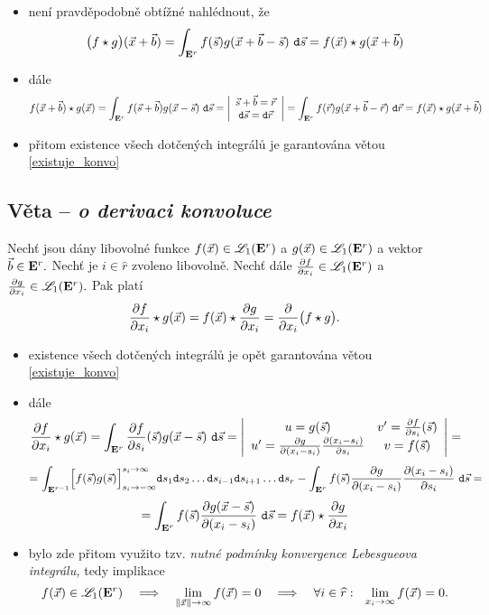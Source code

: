 \Proof

\begin{itemize}
\item nen\'i pravd\v epodobn\v e obt\'i\v zn\'e nahl\'ednout, \v ze
%
$$ \bigl(f \star g\bigr) ({\vec{x}}+{\vec{b}}) = \int_{{{\mathbf E}^r}} f({\vec{s}})g({\vec{x}}+{\vec{b}}-{\vec{s}})~\mathtt{d}{\vec{s}} = f({\vec{x}}) \star g({\vec{x}}+{\vec{b}}) $$
\item d\'ale
%
$$ f({\vec{x}}+{\vec{b}}) \star g({\vec{x}}) = \int_{{{\mathbf E}^r}} f({\vec{s}}+{\vec{b}})g({\vec{x}}-{\vec{s}})~\mathtt{d}{\vec{s}} = \left|\begin{array}{c} {\vec{s}}+{\vec{b}}={\vec{r}}\\ \mathtt{d}{\vec{s}}=\mathtt{d}{\vec{r}} \end{array}\right| = \int_{{{\mathbf E}^r}} f({\vec{r}})g({\vec{x}}+{\vec{b}}-{\vec{r}})~\mathtt{d}{\vec{r}}= f({\vec{x}}) \star g({\vec{x}}+{\vec{b}})$$
\item p\v ritom existence v\v sech dot\v cen\'ych integr\'al\r u je garantov\'ana v\v etou \ref{existuje_konvo}


\end{itemize}

\subsection{Věta -- \emph{o derivaci konvoluce}}

Nech\v t jsou d\'any libovoln\'e funkce $f({\vec{x}})\in{\mathscr L}_1({{\mathbf E}^r})$ a $g({\vec{x}})\in{\mathscr L}_1({{\mathbf E}^r})$ a vektor ${\vec{b}}\in{{\mathbf E}^r}.$ Nech\v t je $i\in \widehat{r}$ zvoleno libovoln\v e. Nech\v t d\'ale  $\frac{\partial f}{\partial x_i} \in{\mathscr L}_1({{\mathbf E}^r})$ a $\frac{\partial g}{\partial x_i}\in{\mathscr L}_1({{\mathbf E}^r}).$ Pak plat\'i
%
$$ \frac{\partial f}{\partial x_i} \star g({\vec{x}}) = f({\vec{x}}) \star \frac{\partial g}{\partial x_i} = \frac{\partial }{\partial x_i}\bigl(f \star g\bigr). $$

\Proof

\begin{itemize}
\item existence v\v sech dot\v cen\'ych integr\'al\r u je op\v et garantov\'ana v\v etou \ref{existuje_konvo}
\item d\'ale
%
$$ \frac{\partial f}{\partial x_i} \star g({\vec{x}}) = \int_{{{\mathbf E}^r}} \frac{\partial f}{\partial s_i}({\vec{s}}) g({\vec{x}}-{\vec{s}})~\mathtt{d}{\vec{s}} =  \left|\begin{array}{cc} u=g({\vec{s}}) & v'=\frac{\partial f}{\partial s_i}({\vec{s}}) \\ u'=\frac{\partial g}{\partial(x_i-s_i)}\frac{\partial(x_i-s_i)}{\partial s_i} & v=f({\vec{s}})\end{array}\right|=$$
%
$$=\int_{{\mathbf E}^{r-1}} \Bigl[f({\vec{s}})g({\vec{s}})\Bigr]_{s_i\rightarrow-\infty}^{s_i\rightarrow\infty} \mathtt{d}s_1\mathtt{d}s_2\ldots\mathtt{d}s_{i-1}\mathtt{d}s_{i+1}\ldots\mathtt{d}s_r - \int_{{{\mathbf E}^r}} f({\vec{s}})\frac{\partial g}{\partial(x_i-s_i)}\frac{\partial(x_i-s_i)}{\partial s_i}~\mathtt{d}{\vec{s}}=$$
%
$$=\int_{{{\mathbf E}^r}} f({\vec{s}})\frac{\partial g({\vec{x}}-{\vec{s}})}{\partial(x_i-s_i)}~\mathtt{d}{\vec{s}} = f({\vec{x}}) \star \frac{\partial g}{\partial x_i}$$

\item bylo zde p\v ritom vyu\v zito tzv. \emph{nutn\'e podm\'inky konvergence Lebesgueova integr\'alu,} tedy implikace
%
$$f({\vec{x}})\in{\mathscr L}_1({{\mathbf E}^r})\quad \Longrightarrow \quad \lim_{\|{\vec{x}}\| \rightarrow \infty} f({\vec{x}})=0 \quad \Longrightarrow \quad \forall i\in \widehat{r}:~~\lim_{x_i \rightarrow \infty} f({\vec{x}})=0.$$

\end{itemize}




